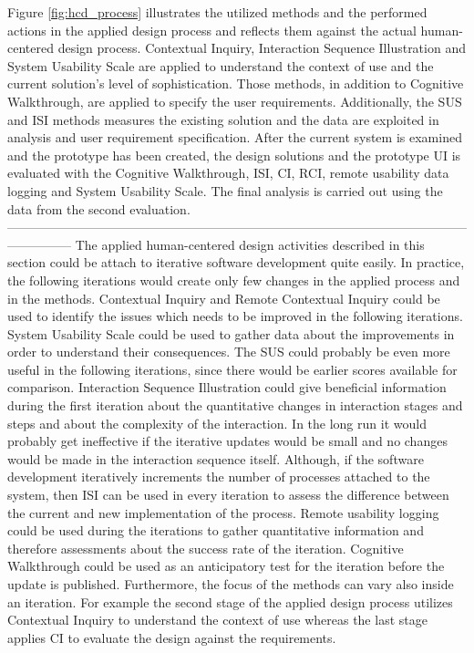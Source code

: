 \documentclass[12pt,a4paper,oneside,pdftex]{report}
\begin{document}
Figure \ref{fig:hcd_process} illustrates the utilized methods and the performed actions in the applied design process and reflects them against the actual human-centered design process. Contextual Inquiry, Interaction Sequence Illustration and System Usability Scale are applied to understand the context of use and the current solution's level of sophistication. Those methods, in addition to Cognitive Walkthrough, are applied to specify the user requirements. Additionally, the SUS and ISI methods measures the existing solution and the data are exploited in analysis and user requirement specification. After the current system is examined and the prototype has been created, the design solutions and the prototype UI is evaluated with the Cognitive Walkthrough, ISI, CI, RCI, remote usability data logging and System Usability Scale. The final analysis is carried out using the data from the second evaluation.  
---------------------------------------------------------------------------------------------------------------------------
The applied human-centered design activities described in this section could be attach to iterative software development quite easily. In practice, the following iterations would create only few changes in the applied process and in the methods. Contextual Inquiry and Remote Contextual Inquiry could be used to identify the issues which needs to be improved in the following iterations. System Usability Scale could be used to gather data about the improvements in order to understand their consequences. The SUS could probably be even more useful in the following iterations, since there would be earlier scores available for comparison. Interaction Sequence Illustration could give beneficial information during the first iteration about the quantitative changes in interaction stages and steps and about the complexity of the interaction. In the long run it would probably get ineffective if the iterative updates would be small and no changes would be made in the interaction sequence itself. Although, if the software development iteratively increments the number of processes attached to the system, then ISI can be used in every iteration to assess the difference between the current and new implementation of the process. Remote usability logging could be used during the iterations to gather quantitative information and therefore assessments about the success rate of the iteration. Cognitive Walkthrough could be used as an anticipatory test for the iteration before the update is published. Furthermore, the focus of the methods can vary also inside an iteration. For example the second stage of the applied design process utilizes Contextual Inquiry to understand the context of use whereas the last stage applies CI to evaluate the design against the requirements. 
\end{document}
